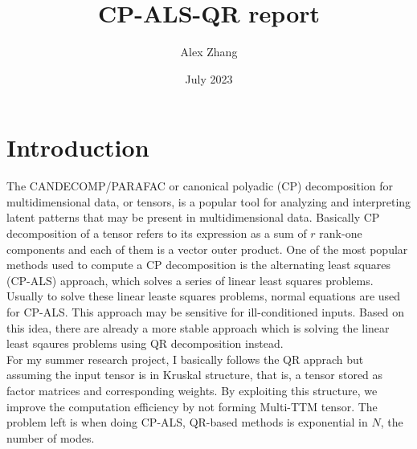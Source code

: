 \documentclass{article}
\title{CP-ALS-QR report}
\author{Alex Zhang}
\date{July 2023}
\begin{document}
\maketitle
\section{Introduction}
The CANDECOMP/PARAFAC or canonical polyadic (CP) decomposition for multidimensional data, 
or tensors, is a popular tool for analyzing and interpreting latent patterns that may be 
present in multidimensional data. Basically CP decomposition of a tensor refers to its
expression as a sum of $r$ rank-one components and each of them is a vector outer product.
One of the most popular methods used to compute a CP decomposition is the alternating least
squares (CP-ALS) approach, which solves a series of linear least squares problems. Usually
to solve these linear leaste squares problems, normal equations are used for CP-ALS. This
approach may be sensitive for ill-conditioned inputs. Based on this idea, there are already
a more stable approach which is solving the linear least sqaures problems using QR decomposition
instead.
\\
For my summer research project, I basically follows the QR apprach but assuming the input tensor
is in Kruskal structure, that is, a tensor stored as factor matrices and corresponding weights.
By exploiting this structure, we improve the computation efficiency by not forming Multi-TTM tensor.
The problem left is when doing CP-ALS, QR-based methods is exponential in $N$, the number of modes.
\end{document}
